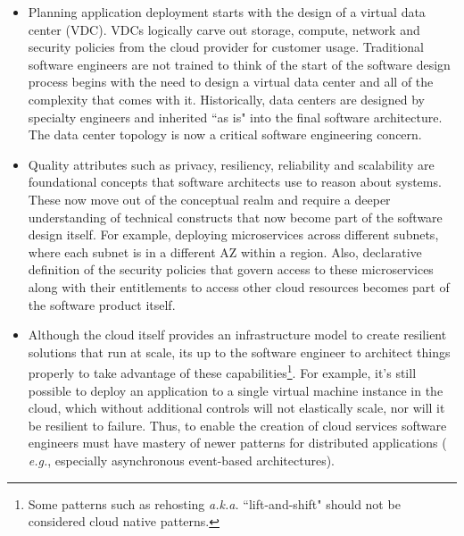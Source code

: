 \documentclass[conference]{IEEEtran}
\begin{document}
\begin{itemize}
	\item  Planning application deployment starts with the design of a virtual data center (VDC). VDCs logically carve out storage, compute, network and security policies from the cloud provider for customer usage. Traditional software engineers are not trained to think of the start of the software design process begins with the need to design a virtual data center and all of the complexity that comes with it.  Historically, data centers are designed by specialty engineers and inherited ``as is" into the final software architecture. The data center topology is now a critical software engineering concern. 
	
	\item  Quality attributes such as privacy, resiliency, reliability and scalability are foundational concepts that software architects use to reason about systems.  These now move out of the conceptual realm and require a deeper understanding of technical constructs that now become part of the software design itself.  For example, deploying microservices across different subnets, where each subnet is in a different AZ within a region. Also, declarative definition of  the security policies that govern access to these microservices along with their entitlements to access other cloud resources becomes part of the software product itself. 
	
	\item  Although the cloud itself provides an infrastructure model to create resilient solutions that run at scale, its up to the software engineer to architect things properly to take advantage of these capabilities\footnote{Some patterns such as rehosting\cite{engelsrud2019moving} {\em a.k.a.} ``lift-and-shift" should not be considered cloud native patterns.}.  For example, it's still possible to deploy an application to a single virtual machine instance in the cloud, which without additional controls will not elastically scale, nor will it be resilient to failure.  Thus, to enable the creation of cloud services software engineers must have mastery of newer patterns for distributed applications ( {\em e.g.}, especially asynchronous event-based architectures).
	

\end{itemize}
\end{document}
